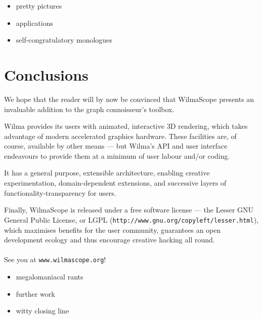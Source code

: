 \documentclass[runningheads]{cl2emult}
\newcommand{\url}[1]{{\small{\tt #1}}}
\begin{document}
\begin{itemize}
\item pretty pictures
\item applications
\item self-congratulatory monologues
\end{itemize}

\section{Conclusions}
\label{sec:conclusions}

We hope that the reader will by now be convinced that WilmaScope presents an
invaluable addition to the graph connoisseur's toolbox.  

Wilma provides its users with animated, interactive 3D rendering, which takes
advantage of modern accelerated graphics hardware.  These facilities are, of
course, available by other means --- but Wilma's API and user interface
endeavours to provide them at a minimum of user labour and/or coding.

It has a general purpose, extensible architecture, enabling creative
experimentation, domain-dependent extensions, and successive layers of
functionality-transparency for users.

Finally, WilmaScope is released under a free software license --- the Lesser
GNU General Public License, or LGPL
(\url{http://www.gnu.org/copyleft/lesser.html}), which maximises benefits for
the user community, guarantees an open development ecology and thus encourage
creative hacking all round.

\paragraph{}

See you at \url{www.wilmascope.org}!

\begin{itemize}
\item megalomaniacal rants
\item further work
\item witty closing line
\end{itemize}
\end{document}
